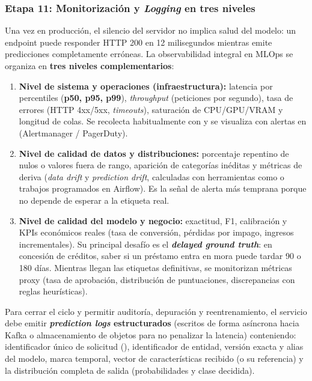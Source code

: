 \subsubsection{Etapa 11: Monitorización y \textit{Logging} en tres niveles}

Una vez en producción, el silencio del servidor no implica salud del modelo: un endpoint puede responder HTTP 200 en 12 milisegundos mientras emite predicciones completamente erróneas. La observabilidad integral en MLOps se organiza en \textbf{tres niveles complementarios}:

\begin{enumerate}
  \item \textbf{Nivel de sistema y operaciones (infraestructura):} latencia por percentiles (\textbf{p50, p95, p99}), \textit{throughput} (peticiones por segundo), tasa de errores (HTTP 4xx/5xx, \textit{timeouts}), saturación de CPU/GPU/VRAM y longitud de colas. Se recolecta habitualmente con  y se visualiza con alertas en  (Alertmanager / PagerDuty).
  \item \textbf{Nivel de calidad de datos y distribuciones:} porcentaje repentino de nulos o valores fuera de rango, aparición de categorías inéditas y métricas de deriva (\textit{data drift} y \textit{prediction drift}, calculadas con herramientas como  o trabajos programados en Airflow). Es la señal de alerta más temprana porque no depende de esperar a la etiqueta real.
  \item \textbf{Nivel de calidad del modelo y negocio:} exactitud, F1, calibración y KPIs económicos reales (tasa de conversión, pérdidas por impago, ingresos incrementales). Su principal desafío es el \textbf{\textit{delayed ground truth}}: en concesión de créditos, saber si un préstamo entra en mora puede tardar 90 o 180 días. Mientras llegan las etiquetas definitivas, se monitorizan métricas proxy (tasa de aprobación, distribución de puntuaciones, discrepancias con reglas heurísticas).
\end{enumerate}

Para cerrar el ciclo y permitir auditoría, depuración y reentrenamiento, el servicio debe emitir \textbf{\textit{prediction logs} estructurados} (escritos de forma asíncrona hacia Kafka o almacenamiento de objetos para no penalizar la latencia) conteniendo: identificador único de solicitud (), identificador de entidad, versión exacta y alias del modelo, marca temporal, vector de características recibido (o su referencia) y la distribución completa de salida (probabilidades y clase decidida).


